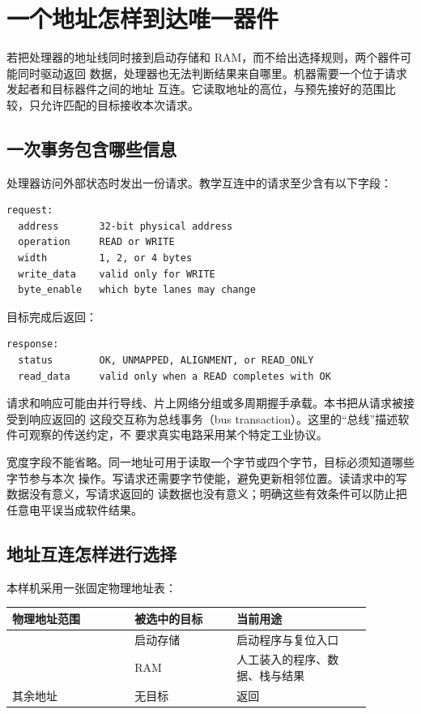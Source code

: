 \section{一个地址怎样到达唯一器件}

若把处理器的地址线同时接到启动存储和 RAM，而不给出选择规则，两个器件可能同时驱动返回
数据，处理器也无法判断结果来自哪里。机器需要一个位于请求发起者和目标器件之间的地址
互连。它读取地址的高位，与预先接好的范围比较，只允许匹配的目标接收本次请求。

\subsection{一次事务包含哪些信息}

处理器访问外部状态时发出一份请求。教学互连中的请求至少含有以下字段：

\begin{lstlisting}
request:
  address       32-bit physical address
  operation     READ or WRITE
  width         1, 2, or 4 bytes
  write_data    valid only for WRITE
  byte_enable   which byte lanes may change
\end{lstlisting}

目标完成后返回：

\begin{lstlisting}
response:
  status        OK, UNMAPPED, ALIGNMENT, or READ_ONLY
  read_data     valid only when a READ completes with OK
\end{lstlisting}

请求和响应可能由并行导线、片上网络分组或多周期握手承载。本书把从请求被接受到响应返回的
这段交互称为总线事务（bus transaction）。这里的“总线”描述软件可观察的传送约定，不
要求真实电路采用某个特定工业协议。

宽度字段不能省略。同一地址可用于读取一个字节或四个字节，目标必须知道哪些字节参与本次
操作。写请求还需要字节使能，避免更新相邻位置。读请求中的写数据没有意义，写请求返回的
读数据也没有意义；明确这些有效条件可以防止把任意电平误当成软件结果。

\subsection{地址互连怎样进行选择}

本样机采用一张固定物理地址表：

\begin{longtable}{|L{0.30\linewidth}|L{0.25\linewidth}|L{0.33\linewidth}|}
\hline
{}
物理地址范围 & 被选中的目标 & 当前用途 \\ \hline
{} & 启动存储 & 启动程序与复位入口 \\ \hline
{} & RAM & 人工装入的程序、数据、栈与结果 \\ \hline
其余地址 & 无目标 & 返回  \\ \hline
\end{longtable}

